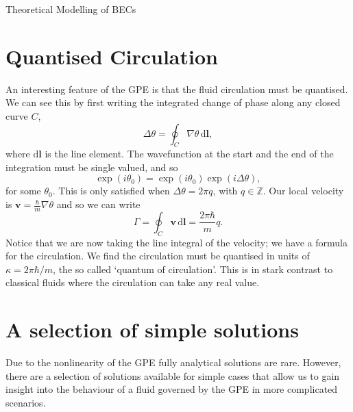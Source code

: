 \begin{chapter}{\label{cha:theoretical_model}Theoretical Modelling of BECs}
\section{\label{section:quantisedcirculation} Quantised Circulation}
An interesting feature of the GPE is that the fluid circulation must be quantised. We can see this by first writing the integrated change of phase along any closed curve $C$,
\begin{equation}
	\Delta\theta = \oint_C \! \nabla \theta  \, \mathrm{d}\mathbf{l},
\end{equation}
where $\mathrm{d}\mathbf{l}$ is the line element. The wavefunction at the start and the end of the integration must be single valued, and so
\begin{equation}
	\exp (i\theta_0) = \exp (i\theta_0)\exp (i\Delta\theta),
\end{equation}
for some $\theta_0$. This is only satisfied when $\Delta\theta = 2\pi q$, with $q\in\mathbb{Z}$. Our local velocity is $\mathbf{v} = \frac{\hbar}{m}\nabla\theta$ and so we can write
\begin{equation}
	\Gamma = \oint_C \! \mathbf{v} \, \mathrm{d}\mathbf{l} = \frac{2 \pi \hbar}{m}q.
\end{equation}
Notice that we are now taking the line integral of the velocity; we have a formula for the circulation. We find the circulation must be quantised in units of $\kappa = 2 \pi \hbar/m$, the so called `quantum of circulation'. This is in stark contrast to classical fluids where the circulation can take any real value.

\section{\label{section:solutions} A selection of simple solutions}
	Due to the nonlinearity of the GPE fully analytical solutions are rare. However, there are a selection of solutions available for simple cases that allow us to gain insight into the behaviour of a fluid governed by the GPE in more complicated scenarios.

\end{chapter}
